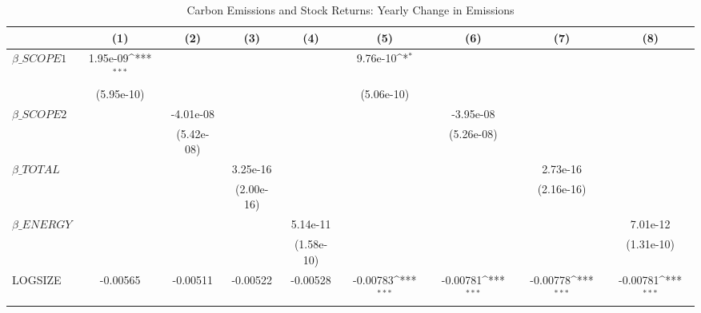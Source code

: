 \begin{table}[htbp]\centering
\def\sym#1{\ifmmode^{#1}\else\(^{#1}\)\fi}
\caption{Carbon Emissions and Stock Returns: Yearly Change in Emissions}
\begin{tabular}{l*{8}{c}}
\hline\hline
                    &\multicolumn{1}{c}{(1)}         &\multicolumn{1}{c}{(2)}         &\multicolumn{1}{c}{(3)}         &\multicolumn{1}{c}{(4)}         &\multicolumn{1}{c}{(5)}         &\multicolumn{1}{c}{(6)}         &\multicolumn{1}{c}{(7)}         &\multicolumn{1}{c}{(8)}         \\
\hline
$\beta\_SCOPE1$      &    1.95e-09\sym{***}&                     &                     &                     &    9.76e-10\sym{*}  &                     &                     &                     \\
                    &  (5.95e-10)         &                     &                     &                     &  (5.06e-10)         &                     &                     &                     \\
$\beta\_SCOPE2$      &                     &   -4.01e-08         &                     &                     &                     &   -3.95e-08         &                     &                     \\
                    &                     &  (5.42e-08)         &                     &                     &                     &  (5.26e-08)         &                     &                     \\
$\beta\_TOTAL$       &                     &                     &    3.25e-16         &                     &                     &                     &    2.73e-16         &                     \\
                    &                     &                     &  (2.00e-16)         &                     &                     &                     &  (2.16e-16)         &                     \\
$\beta\_ENERGY$      &                     &                     &                     &    5.14e-11         &                     &                     &                     &    7.01e-12         \\
                    &                     &                     &                     &  (1.58e-10)         &                     &                     &                     &  (1.31e-10)         \\
LOGSIZE             &    -0.00565         &    -0.00511         &    -0.00522         &    -0.00528         &    -0.00783\sym{***}&    -0.00781\sym{***}&    -0.00778\sym{***}&    -0.00781\sym{***}\\

\end{tabular}
\end{table}
